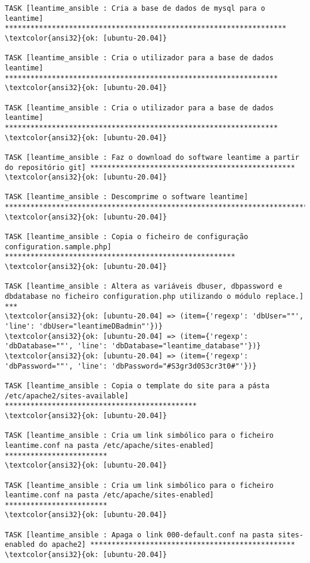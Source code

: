 \documentclass{scrartcl}
\begin{document}
\begin{Verbatim}
TASK [leantime_ansible : Cria a base de dados de mysql para o leantime] ******************************************************************
\textcolor{ansi32}{ok: [ubuntu-20.04]}

TASK [leantime_ansible : Cria o utilizador para a base de dados leantime] ****************************************************************
\textcolor{ansi32}{ok: [ubuntu-20.04]}

TASK [leantime_ansible : Cria o utilizador para a base de dados leantime] ****************************************************************
\textcolor{ansi32}{ok: [ubuntu-20.04]}

TASK [leantime_ansible : Faz o download do software leantime a partir do repositório git] ************************************************
\textcolor{ansi32}{ok: [ubuntu-20.04]}

TASK [leantime_ansible : Descomprime o software leantime] ********************************************************************************
\textcolor{ansi32}{ok: [ubuntu-20.04]}

TASK [leantime_ansible : Copia o ficheiro de configuração configuration.sample.php] ******************************************************
\textcolor{ansi32}{ok: [ubuntu-20.04]}

TASK [leantime_ansible : Altera as variáveis dbuser, dbpassword e dbdatabase no ficheiro configuration.php utilizando o módulo replace.] ***
\textcolor{ansi32}{ok: [ubuntu-20.04] => (item={'regexp': 'dbUser=""', 'line': 'dbUser="leantimeDBadmin"'})}
\textcolor{ansi32}{ok: [ubuntu-20.04] => (item={'regexp': 'dbDatabase=""', 'line': 'dbDatabase="leantime_database"'})}
\textcolor{ansi32}{ok: [ubuntu-20.04] => (item={'regexp': 'dbPassword=""', 'line': 'dbPassword="#S3gr3d0S3cr3t0#"'})}

TASK [leantime_ansible : Copia o template do site para a pásta /etc/apache2/sites-available] *********************************************
\textcolor{ansi32}{ok: [ubuntu-20.04]}

TASK [leantime_ansible : Cria um link simbólico para o ficheiro leantime.conf na pasta /etc/apache/sites-enabled] ************************
\textcolor{ansi32}{ok: [ubuntu-20.04]}

TASK [leantime_ansible : Cria um link simbólico para o ficheiro leantime.conf na pasta /etc/apache/sites-enabled] ************************
\textcolor{ansi32}{ok: [ubuntu-20.04]}

TASK [leantime_ansible : Apaga o link 000-default.conf na pasta sites-enabled do apache2] ************************************************
\textcolor{ansi32}{ok: [ubuntu-20.04]}


\end{Verbatim}
\end{document}
